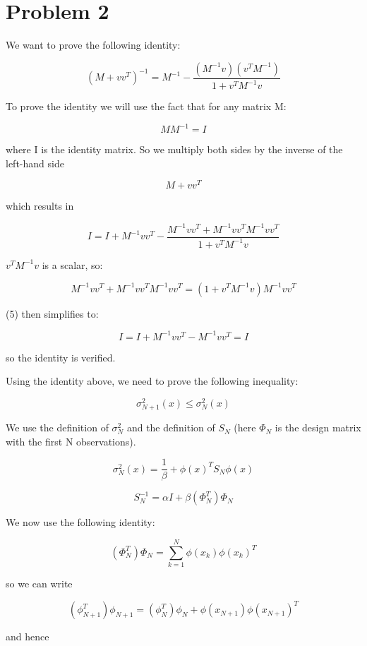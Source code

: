 \documentclass[12pt]{article}
\begin{document}
\section*{Problem 2}

We want to prove the following identity:

\[ (M + vv^T)^{-1} = M^{-1} - \frac{(M^{-1} v) (v^T M^{-1})  }{1 + v^T M^{-1} v} \]

To prove the identity we will use the fact that for any matrix M:

\[
M M^{-1} = I
\]

where I is the identity matrix. So we multiply both sides by the inverse of the left-hand side

\[
M + vv^T
\]

which results in

\begin{equation}
I = I + M^{-1}vv^T - \frac{M^{-1} v v^T + M^{-1} v v^T M^{-1} v v^T}{1 + v^T M^{-1} v}
\end{equation}

$ v^T M^{-1} v $ is a scalar, so:

\[
M^{-1} v v^T + M^{-1} v v^T M^{-1} v v^T = ( 1 + v^T M^{-1} v ) M^{-1} v v^T
\]

(5) then simplifies to:

\[
I = I + M^{-1}vv^T - M^{-1}vv^T = I
\]

so the identity is verified.

Using the identity above, we need to prove the following inequality:

\begin{equation}
\sigma^2_{N+1} (x) \leq \sigma^2_{N} (x)
\end{equation}

We use the definition of $\sigma^2_{N}$ and the definition of $S_N$ (here $ \Phi_N $ is the design matrix with the first N observations).

\[
\sigma^2_{N} (x) = \frac{1}{\beta} + \phi(x)^T S_N \phi(x)
\]

\[
S^{-1}_{N} = \alpha I + \beta (\Phi^T_{N}) \Phi_N
\]

We now use the following identity:

\[
(\Phi^T_{N}) \Phi_N = \sum_{k=1}^N \phi(x_k) \phi(x_k)^T
\]

so we can write

\[
(\phi^T_{N+1}) \phi_{N+1} =(\phi^T_{N}) \phi_N + \phi(x_{N+1}) \phi(x_{N+1})^T
\]

and hence 
\end{document}

